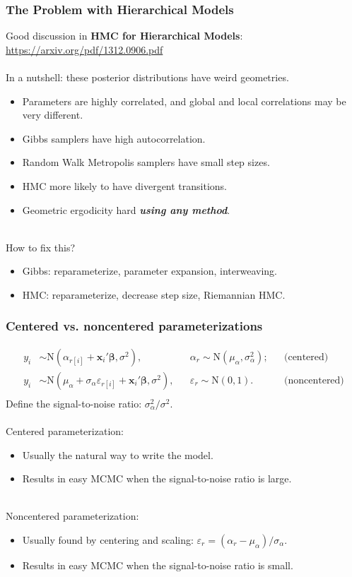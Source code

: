 \documentclass[xcolor=dvipsnames]{beamer}
\begin{document}
\begin{frame}[fragile]
\frametitle{The Problem with Hierarchical Models}
Good discussion in \textbf{HMC for Hierarchical Models}: \url{https://arxiv.org/pdf/1312.0906.pdf}\\~\\

In a nutshell: these posterior distributions have weird geometries.
\begin{itemize}
\item Parameters are highly correlated, and global and local correlations may be very different.
\item Gibbs samplers have high autocorrelation.
\item Random Walk Metropolis samplers have small step sizes.
\item HMC more likely to have divergent transitions.
\item Geometric ergodicity hard \textbf{\emph{using any method}}.\\~\\
\end{itemize}
How to fix this?
\begin{itemize}
\item Gibbs: reparameterize, parameter expansion, interweaving.
\item HMC: reparameterize, decrease step size, Riemannian HMC.
\end{itemize}
\end{frame}

\begin{frame}[fragile]
\frametitle{Centered vs. noncentered parameterizations}
\begin{align*}
y_i &\sim \mathrm{N}(\alpha_{r[i]} + \bm{x}_i'\bm{\beta}, \sigma^2), && \alpha_r \sim \mathrm{N}(\mu_{\alpha}, \sigma_{\alpha}^2); && \mbox{(centered)}\\
y_i &\sim \mathrm{N}(\mu_{\alpha} + \sigma_{\alpha}\varepsilon_{r[i]} + \bm{x}_i'\bm{\beta}, \sigma^2), && \varepsilon_r \sim \mathrm{N}(0, 1). && \mbox{(noncentered)}\\
\end{align*}
Define the signal-to-noise ratio: $\sigma_{\alpha}^2/\sigma^2$.\\~\\

Centered parameterization:
\begin{itemize}
\item Usually the natural way to write the model.
\item Results in easy MCMC when the signal-to-noise ratio is large.\\~\\
\end{itemize}
Noncentered parameterization:
\begin{itemize}
\item Usually found by centering and scaling: $\varepsilon_r = (\alpha_r - \mu_{\alpha})/\sigma_{\alpha}$.
\item Results in easy MCMC when the signal-to-noise ratio is small.
\end{itemize}
\end{frame}
\end{document}
